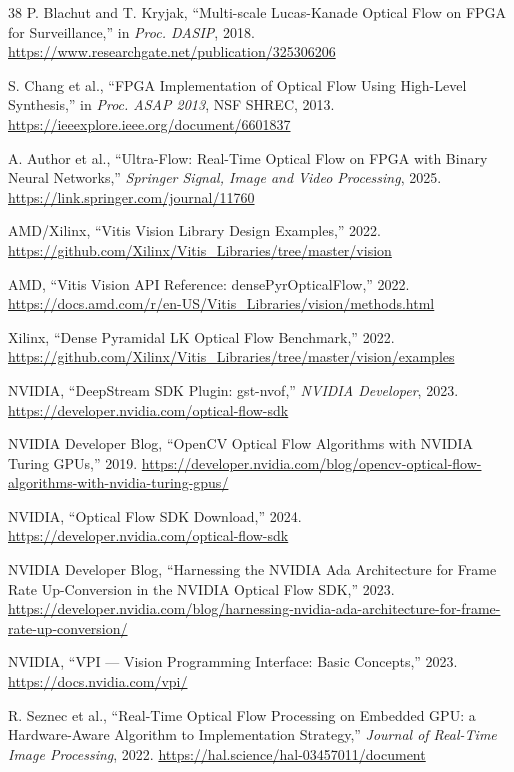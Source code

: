 \documentclass[conference]{IEEEtran}
\begin{document}
\begin{thebibliography}{38}
P. Blachut and T. Kryjak, ``Multi-scale Lucas-Kanade Optical Flow on FPGA for Surveillance,'' in \textit{Proc. DASIP}, 2018. \url{https://www.researchgate.net/publication/325306206}

S. Chang et al., ``FPGA Implementation of Optical Flow Using High-Level Synthesis,'' in \textit{Proc. ASAP 2013}, NSF SHREC, 2013. \url{https://ieeexplore.ieee.org/document/6601837}

A. Author et al., ``Ultra-Flow: Real-Time Optical Flow on FPGA with Binary Neural Networks,'' \textit{Springer Signal, Image and Video Processing}, 2025. \url{https://link.springer.com/journal/11760}

AMD/Xilinx, ``Vitis Vision Library Design Examples,'' 2022. \url{https://github.com/Xilinx/Vitis_Libraries/tree/master/vision}

AMD, ``Vitis Vision API Reference: densePyrOpticalFlow,'' 2022. \url{https://docs.amd.com/r/en-US/Vitis_Libraries/vision/methods.html}

Xilinx, ``Dense Pyramidal LK Optical Flow Benchmark,'' 2022. \url{https://github.com/Xilinx/Vitis_Libraries/tree/master/vision/examples}

NVIDIA, ``DeepStream SDK Plugin: gst-nvof,'' \textit{NVIDIA Developer}, 2023. \url{https://developer.nvidia.com/optical-flow-sdk}

NVIDIA Developer Blog, ``OpenCV Optical Flow Algorithms with NVIDIA Turing GPUs,'' 2019. \url{https://developer.nvidia.com/blog/opencv-optical-flow-algorithms-with-nvidia-turing-gpus/}

NVIDIA, ``Optical Flow SDK Download,'' 2024. \url{https://developer.nvidia.com/optical-flow-sdk}

NVIDIA Developer Blog, ``Harnessing the NVIDIA Ada Architecture for Frame Rate Up-Conversion in the NVIDIA Optical Flow SDK,'' 2023. \url{https://developer.nvidia.com/blog/harnessing-nvidia-ada-architecture-for-frame-rate-up-conversion/}

NVIDIA, ``VPI --- Vision Programming Interface: Basic Concepts,'' 2023. \url{https://docs.nvidia.com/vpi/}

R. Seznec et al., ``Real-Time Optical Flow Processing on Embedded GPU: a Hardware-Aware Algorithm to Implementation Strategy,'' \textit{Journal of Real-Time Image Processing}, 2022. \url{https://hal.science/hal-03457011/document}


\end{thebibliography}
\end{document}
